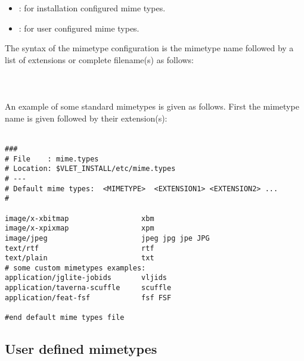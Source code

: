 \begin{itemize}
  \item {}: for installation configured mime
  types.
  \item {}: for user configured mime types.
\end{itemize}

The syntax of the mimetype configuration is the mimetype name followed by a list
of extensions or complete filename(s) as follows: \\
\\
\tab {}\\
\\
An example of some standard mimetypes is given as follows. First the
mimetype name is given followed by their extension(s):\\
\\
\begin{boxedlisting}[170]
\begin{verbatim}
###
# File    : mime.types
# Location: $VLET_INSTALL/etc/mime.types
# ---
# Default mime types:  <MIMETYPE>  <EXTENSION1> <EXTENSION2> ...
#

image/x-xbitmap                 xbm 
image/x-xpixmap                 xpm
image/jpeg                      jpeg jpg jpe JPG
text/rtf                        rtf
text/plain                      txt
# some custom mimetypes examples: 
application/jglite-jobids       vljids 
application/taverna-scuffle     scuffle
application/feat-fsf            fsf FSF 

#end default mime types file 
\end{verbatim}
\end{boxedlisting}

\subsection{User defined mimetypes}

